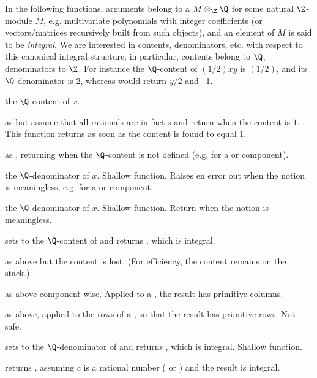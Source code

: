 In the following functions, arguments belong to a $M\otimes_\Z\Q$
for some natural $\Z$-module $M$, e.g. multivariate polynomials with integer
coefficients (or vectors/matrices recursively built from such objects), and
an element of $M$ is said to be \emph{integral}.
We are interested in contents, denominators, etc. with respect to this
canonical integral structure; in particular, contents belong to $\Q$,
denominators to $\Z$. For instance the $\Q$-content of $(1/2)xy$ is $(1/2)$,
and its $\Q$-denominator is $2$, whereas  would return $y/2$ and
~1.

 the $\Q$-content of $x$.

 as  but assume that all rationals
are in fact s and return  when the content is $1$. This
function returns as soon as the content is found to equal $1$.

 as , returning
 when the $\Q$-content is not defined (e.g. for a 
or  component).

 the $\Q$-denominator of $x$. Shallow function.
Raises en  error out when the notion is meaningless, e.g. for
a  or  component.

 the $\Q$-denominator of $x$. Shallow function.
Return  when the notion is meaningless.

 sets  to the $\Q$-content
of  and returns , which is integral.

 as above but the content is lost. (For
efficiency, the content remains on the stack.)

 as above component-wise. Applied to a
, the result has primitive columns.

 as above, applied to the rows of a
, so that the result has primitive rows. Not -safe.

 sets  to the
$\Q$-denominator of  and returns , which is integral.
Shallow function.

 returns , assuming $c$
is a rational number ( or ) and the result is integral.

